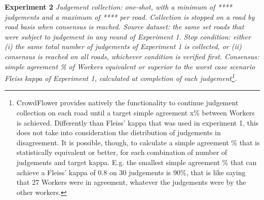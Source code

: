 \textbf{Experiment 2} {\it Judgement collection: one-shot, with a minimum of **** judgements and a maximum of **** per road. Collection is stopped on a road by road basis when consensus is reached. Source dataset: the same set roads that were subject to judgement in any round of Experiment 1. Stop condition: either (i) the same total number of judgements of Experiment 1 is collected, or (ii) consensus is reached on all roads, whichever condition is verified first. Consensus: simple agreement \% of Workers equivalent or superior to the worst case scenario Fleiss kappa of Experiment 1, calculated at completion of each judgement\footnote{CrowdFlower provides natively the functionality to continue judgement collection on each road until a target simple agreement x\% between Workers is achieved. Differently than Fleiss' kappa that was used in experiment 1, this does not take into consideration the distribution of judgements in disagreement. It is possible, though, to calculate a simple agreement \% that is statistically equivalent or better, for each combination of number of judgements and target kappa. E.g. the smallest simple agreement \% that can achieve a Fleiss' kappa of 0.8 on 30 judgements is 90\%, that is like saying that 27 Workers were in agreement, whatever the judgements were by the other workers.}.} 
